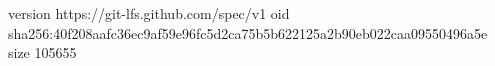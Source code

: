 version https://git-lfs.github.com/spec/v1
oid sha256:40f208aafc36ec9af59e96fc5d2ca75b5b622125a2b90eb022caa09550496a5e
size 105655
